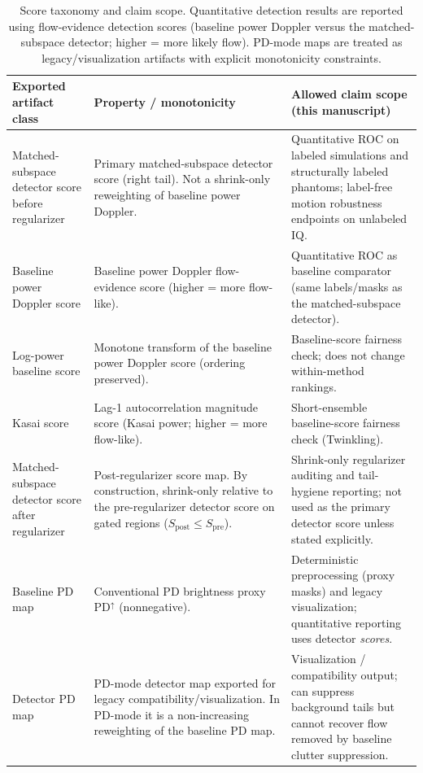 \begin{table}[t]
\centering
\small
\begingroup
\setlength{\tabcolsep}{4pt}
\begin{tabular}{@{}P{3.9cm} P{6.6cm} P{4.8cm}@{}}
\hline
Exported artifact class & Property / monotonicity & Allowed claim scope (this manuscript) \\
\hline
Matched-subspace detector score before regularizer & Primary matched-subspace detector score (right tail). Not a shrink-only reweighting of baseline power Doppler. & Quantitative ROC on labeled simulations and structurally labeled phantoms; label-free motion robustness endpoints on unlabeled IQ. \\
Baseline power Doppler score & Baseline power Doppler flow-evidence score (higher = more flow-like). & Quantitative ROC as baseline comparator (same labels/masks as the matched-subspace detector). \\
Log-power baseline score & Monotone transform of the baseline power Doppler score (ordering preserved). & Baseline-score fairness check; does not change within-method rankings. \\
Kasai score & Lag-1 autocorrelation magnitude score (Kasai power; higher = more flow-like). & Short-ensemble baseline-score fairness check (Twinkling). \\
Matched-subspace detector score after regularizer & Post-regularizer score map. By construction, shrink-only relative to the pre-regularizer detector score on gated regions ($S_{\mathrm{post}}\le S_{\mathrm{pre}}$). & Shrink-only regularizer auditing and tail-hygiene reporting; not used as the primary detector score unless stated explicitly. \\
Baseline PD map & Conventional PD brightness proxy $\mathrm{PD}^{\uparrow}$ (nonnegative). & Deterministic preprocessing (proxy masks) and legacy visualization; quantitative reporting uses detector \emph{scores}. \\
Detector PD map & PD-mode detector map exported for legacy compatibility/visualization. In PD-mode it is a non-increasing reweighting of the baseline PD map. & Visualization / compatibility output; can suppress background tails but cannot recover flow removed by baseline clutter suppression. \\
\hline
\end{tabular}
\endgroup
\caption{Score taxonomy and claim scope. Quantitative detection results are reported using flow-evidence detection scores (baseline power Doppler versus the matched-subspace detector; higher = more likely flow). PD-mode maps are treated as legacy/visualization artifacts with explicit monotonicity constraints.}
\label{tab:score_taxonomy_bundle_schema}
\end{table}
